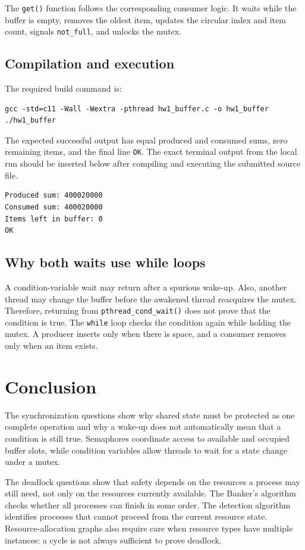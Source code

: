 \documentclass[conference]{IEEEtran}
\begin{document}
The \texttt{get()} function follows the corresponding consumer logic. It waits while the buffer is empty, removes the oldest item, updates the circular index and item count, signals \texttt{not\_full}, and unlocks the mutex.

\subsection{Compilation and execution}
The required build command is:

\begin{lstlisting}[style=terminal]
gcc -std=c11 -Wall -Wextra -pthread hw1_buffer.c -o hw1_buffer
./hw1_buffer
\end{lstlisting}

The expected successful output has equal produced and consumed sums, zero remaining items, and the final line \texttt{OK}. The exact terminal output from the local run should be inserted below after compiling and executing the submitted source file.

\begin{lstlisting}[style=terminal]
Produced sum: 400020000
Consumed sum: 400020000
Items left in buffer: 0
OK
\end{lstlisting}

\subsection{Why both waits use while loops}
A condition-variable wait may return after a spurious wake-up. Also, another thread may change the buffer before the awakened thread reacquires the mutex. Therefore, returning from \texttt{pthread\_cond\_wait()} does not prove that the condition is true. The \texttt{while} loop checks the condition again while holding the mutex. A producer inserts only when there is space, and a consumer removes only when an item exists.

\section{Conclusion}
The synchronization questions show why shared state must be protected as one complete operation and why a wake-up does not automatically mean that a condition is still true. Semaphores coordinate access to available and occupied buffer slots, while condition variables allow threads to wait for a state change under a mutex.

The deadlock questions show that safety depends on the resources a process may still need, not only on the resources currently available. The Banker's algorithm checks whether all processes can finish in some order. The detection algorithm identifies processes that cannot proceed from the current resource state. Resource-allocation graphs also require care when resource types have multiple instances: a cycle is not always sufficient to prove deadlock.
\end{document}
